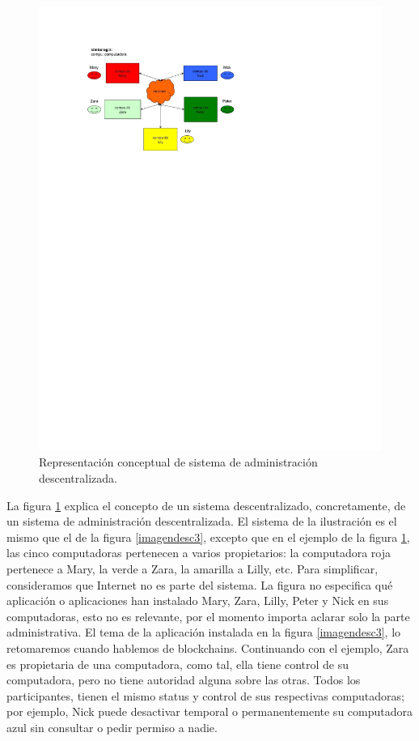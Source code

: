 \documentclass[12pt]{report} %
\begin{document}
 
\begin{figure}
\centering
\includegraphics[width=0.85\columnwidth]{imagenes/imagendesc4.pdf}
\caption{Representación conceptual de sistema de administración descentralizada.}
\label{fig:imagendesc4}
\end{figure} 


La figura  \ref{fig:imagendesc4} explica el concepto de un sistema descentralizado, concretamente, de un sistema de administración descentralizada. El sistema de la ilustración es el mismo que el de la figura \ref{imagendesc3}, excepto que en el ejemplo de la figura  \ref{fig:imagendesc4}, las cinco computadoras pertenecen a varios propietarios: la computadora roja pertenece a Mary, la verde a Zara, la amarilla a Lilly, etc.  Para simplificar, consideramos que Internet no es parte del sistema. La figura no especifica qué aplicación o aplicaciones han instalado Mary, Zara, Lilly, Peter y Nick en sus computadoras, esto no es relevante, por el momento importa aclarar solo la parte administrativa. El tema de la aplicación instalada en la figura \ref{imagendesc3}, lo retomaremos cuando hablemos de blockchains. Continuando con el ejemplo, Zara es propietaria de una computadora, como tal, ella tiene control de su computadora, pero no tiene autoridad alguna sobre las otras. Todos los participantes, tienen el mismo status y control de sus respectivas computadoras; por ejemplo, Nick puede desactivar temporal o permanentemente su computadora azul sin consultar o pedir permiso a nadie. 
\end{document}
